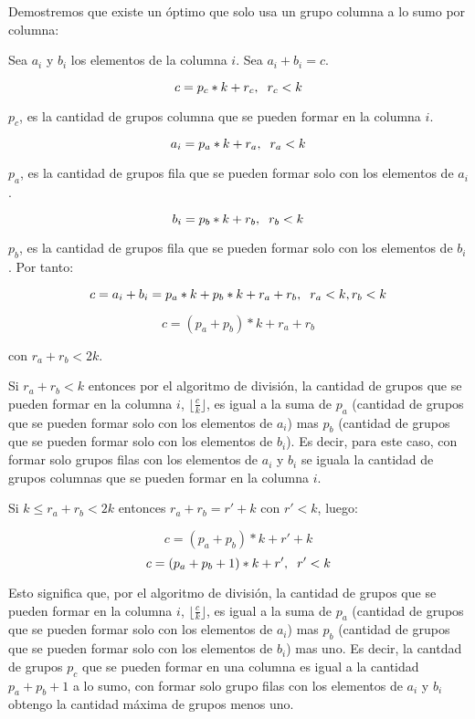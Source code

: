 \documentclass[article]{llncs}
\begin{document}
Demostremos que existe un \'optimo que solo usa un grupo columna a lo sumo 
por columna:

Sea $a_i$ y $b_i$ los elementos de la columna $i$. Sea $a_i + b_i = c$.

$$c = p_c * k + r_c, \hspace{0,2cm} r_c < k$$

$p_c$, es la cantidad de grupos columna que se pueden formar en la columna $i$.

$$a_i = p_a * k + r_a, \hspace{0,2cm} r_a < k$$

$p_a$, es la cantidad de grupos fila que se pueden formar solo con los elementos de $a_i$.

$$b_i = p_b * k + r_b, \hspace{0,2cm} r_b < k$$

$p_b$, es la cantidad de grupos fila que se pueden formar solo con los elementos de $b_i$. Por tanto:

$$c = a_i + b_i = p_a * k + p_b * k + r_a + r_b, \hspace{0,2cm} r_a < k, r_b < k$$

$$c = (p_a + p_b)*k + r_a + r_b$$

con $r_a + r_b < 2k$.

Si $r_a + r_b < k$ entonces por el algoritmo de divisi\'on, la cantidad de grupos que 
se pueden formar en la columna $i$, $\lfloor\frac{c}{k}\rfloor$, es igual a la suma 
de $p_a$ (cantidad de grupos que se pueden formar solo con los elementos de $a_i$) mas 
$p_b$ (cantidad de grupos que se pueden formar solo con los elementos de $b_i$). Es decir, para este caso,
con formar solo grupos filas con los elementos de $a_i$ y $b_i$ se iguala la cantidad 
de grupos columnas que se pueden formar en la columna $i$. 

Si $k \leq r_a + r_b < 2k$ entonces $r_a + r_b = r' + k$ con $r' < k$, luego:

$$c = (p_a + p_b)*k + r' + k$$
$$c = (p_a + p_b + 1)*k + r', \hspace{0,2cm} r' < k$$

Esto significa que, por el algoritmo de divisi\'on, la cantidad de grupos que 
se pueden formar en la columna $i$, $\lfloor\frac{c}{k}\rfloor$, es igual a la suma 
de $p_a$ (cantidad de grupos que se pueden formar solo con los elementos de $a_i$) mas 
$p_b$ (cantidad de grupos que se pueden formar solo con los elementos de $b_i$) mas uno. 
Es decir, la cantdad de grupos $p_c$ que se pueden formar en una columna es igual a la cantidad $p_a + p_b + 1$ 
a lo sumo, con formar solo grupo filas con los elementos de $a_i$ y $b_i$
obtengo la cantidad m\'axima de grupos menos uno.
\end{document}
